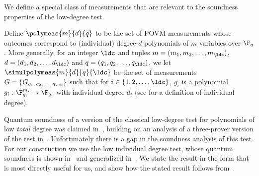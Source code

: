 We define a special class of measurements that are relevant to the soundness
properties of the low-degree test.

\begin{definition}
  \label{def:ld-meas}
  Define $\polymeas{m}{d}{q}$ to be the set of POVM measurements whose outcomes
  correspond to (individual) degree-$d$ polynomials of $m$ variables over
  $\F_q$.
  More generally, for an integer $\ldc$ and tuples $m=(m_1, m_2, \ldots,
  m_\ldc)$, $d=(d_1, d_2, \ldots, d_\ldc)$ and $q=(q_1, q_2, \ldots, q_\ldc)$,
  we let $\simulpolymeas{m}{d}{q}{\ldc}$ be the set of measurements $G =
  \{G_{g_1,\, g_2,\, \ldots\,,\, g_\ldc}\}$ such that for $i\in\{1, 2, \ldots,
  \ldc\}$, $g_i$ is a polynomial $g_i:\F_{q_i}^{m_i} \rightarrow
  \F_{q_i}$ with individual degree $d_i$ (see  for a definition of individual degree). 
\end{definition}

Quantum soundness of a version of the classical low-degree test for polynomials of low \emph{total} degree was claimed
in~\cite{natarajan2018low}, building on an analysis of a three-prover version of the test in~\cite{vidick2016three}. Unfortunately there is a gap in the soundness analysis of this test. For our construction we use the low individual degree test, whose quantum soundness is shown in~\cite{ML20} and generalized in~\cite{ji2021quantum}. We state the result in the form that is most directly useful for us, and show how the stated result follows from~\cite{ji2021quantum}.

